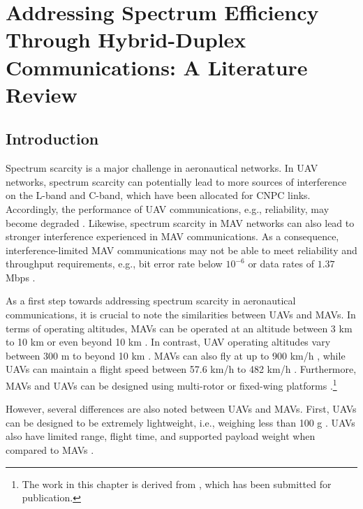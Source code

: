 \chapter{Addressing Spectrum Efficiency Through Hybrid-Duplex Communications: A Literature Review}
\label{chap:lit_review}
\section{Introduction}

Spectrum scarcity is a major challenge in aeronautical networks. In UAV networks, spectrum scarcity can potentially lead to more sources of interference on the L-band and C-band, which have been allocated for CNPC links. Accordingly, the performance of UAV communications, e.g., reliability, may become degraded \cite{hellaoui2018aerial}. Likewise, spectrum scarcity in MAV networks can also lead to stronger interference experienced in MAV communications. As a consequence, interference-limited MAV communications may not be able to meet reliability and throughput requirements, e.g., bit error rate below $10^{-6}$ \cite{epple2014overview} or data rates of $1.37$ Mbps \cite{zhang2017adaptive}.

As a first step towards addressing spectrum scarcity in aeronautical communications, it is crucial to note the similarities between UAVs and MAVs. In terms of operating altitudes, MAVs can be operated at an altitude between 3 km to 10 km \cite{castillo2018communication} or even beyond 10 km \cite{cao2018airborne}. In contrast, UAV operating altitudes vary between 300 m \cite{motlagh2016low} to beyond 10 km \cite{fotouhi2019survey}. MAVs can also fly at up to 900 km/h \cite{castillo2018communication}, while UAVs can maintain a flight speed between 57.6 km/h to 482 km/h \cite{fotouhi2019survey}. Furthermore, MAVs and UAVs can be designed using multi-rotor or fixed-wing platforms \cite{fotouhi2019survey}.\footnote{The work in this chapter is derived from \cite{ernest2019addressing}, which has been submitted for publication.}

However, several differences are also noted between UAVs and MAVs. First, UAVs can be designed to be extremely lightweight, i.e., weighing less than 100 g \cite{fotouhi2019survey}. UAVs also have limited range, flight time, and supported payload weight when compared to MAVs \cite{fotouhi2019survey}. 

